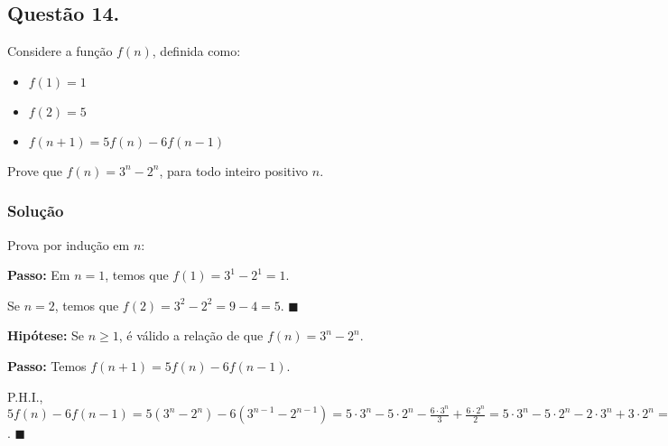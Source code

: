 \documentclass[12pt, letterpaper]{report}
\newcommand*{\CQD}{\hfill\ensuremath{\blacksquare}}%
\newcounter{ProblemNum}
\newcommand*{\anyproblem}[1]{\newpage\subsection*{#1}}
\newcommand*{\problem}[1]{\stepcounter{ProblemNum} %
   \anyproblem{Questão #1}}
\newcommand*{\soln}[1]{\subsubsection*{#1}}
\newcommand*{\solution}{\soln{Solução}}
\begin{document}
\problem{14.}
Considere a função $ f(n) $, definida como:
  \begin{itemize}
    \item $ f(1) = 1 $
    \item $ f(2) = 5 $
    \item $ f(n + 1) = 5f(n) - 6f(n - 1) $
  \end{itemize}

Prove que $ f(n) = 3^n - 2^n $, para todo inteiro positivo $ n $.

\solution
  Prova por indução em $n$:

  \textbf{Passo:} Em $n = 1$, temos que $f(1) = 3^1 - 2^1 = 1$. 

  Se $n = 2$, temos que $f(2) = 3^2 - 2^2 = 9 - 4 = 5$. \CQD

  \textbf{Hipótese:} Se $n \geq 1$, é válido a relação de que $f(n) = 3^n - 2^n$.

  \textbf{Passo:} Temos $f(n + 1) = 5f(n) - 6f(n - 1)$. 

  P.H.I., $5f(n) - 6f(n - 1) = 5(3^n - 2^n) - 6(3^{n - 1} - 2^{n - 1}) = 5 \cdot 3^n - 5 \cdot 2^n - \frac{6 \cdot 3^{n}}{3} + \frac{6 \cdot 2^{n}}{2} = 
  5 \cdot 3^n - 5 \cdot 2^n - 2 \cdot 3^{n} + 3 \cdot 2^{n} = 3 \cdot 3^n - 2 \cdot 2^n = 3^{n + 1} - 2^{n + 1}$. \CQD
\end{document}
